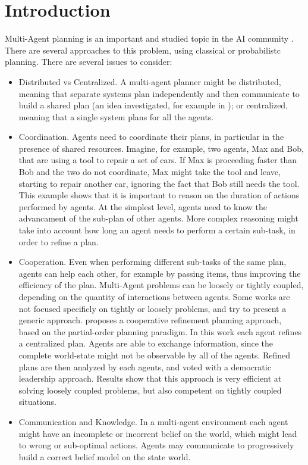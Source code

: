 \section{Introduction}
\label{sec:mamdp-intro}
Multi-Agent planning   is an important and studied topic in the AI community \citep{durfee1999survey}. There are several approaches to this problem, using classical or probabilistc planning. There are several issues to consider:
\begin{itemize}
\item Distributed vs Centralized. A multi-agent planner might be distributed, meaning that separate systems plan independently and then communicate to build a shared plan (an idea investigated, for example in \cite{nikolaidis2013cross,guestrin2002distributed} ); or centralized, meaning that a single system plans for all the agents.
\item Coordination. Agents need to coordinate their plans, in particular in the presence of shared resources. Imagine, for example, two agents, Max and Bob, that are using a tool to repair a set of cars. If Max is proceeding faster than Bob and the two do not coordinate, Max might take the tool and leave, starting to repair another car, ignoring the fact that Bob still needs the tool. This example shows that it is important to reason on the duration of actions performed by agents. At the simplest level, agents need to know the advancament of the sub-plan of other agents. More complex reasoning might take into account how long an agent needs to perform a certain sub-task, in order to refine a plan. 
\item Cooperation. Even when performing different sub-tasks of the same plan, agents can help each other, for example by passing items, thus improving the efficiency of the plan. Multi-Agent problems can be loosely or tightly coupled, depending on the quantity of interactions between agents. Some works are not focused specificly on tightly or loosely problems, and try to present a generic approach. \cite{torreno2015approach} proposes a cooperative refinement planning approach, based on the partial-order planning paradigm. In this work each agent refines a centralized plan. Agents are able to exchange information, since the complete world-state might not be observable by all of the agents. Refined plans are then analyzed by each agents, and voted with a democratic leadership approach. Results show that this approach is very efficient at solving loosely coupled problems, but also competent on tightly coupled situations. 

\item Communication and Knowledge. In a multi-agent environment each agent might have an incomplete or incorrent belief on the world, which might lead to wrong or sub-optimal actions. Agents may communicate to progressively build a correct belief model on the state world. 
\end{itemize}

